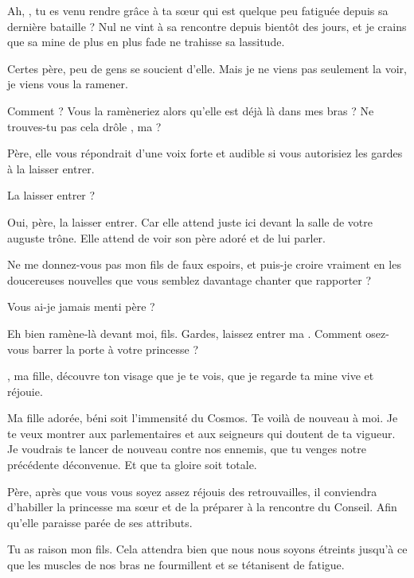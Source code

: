 \begin{drama}

  \roispeaks Ah, \elena, tu es venu rendre grâce à ta sœur qui est quelque peu fatiguée depuis sa dernière bataille ? Nul ne vint à sa rencontre depuis bientôt des jours, et je crains que sa mine de plus en plus fade ne trahisse sa lassitude.

  \elenaspeaks Certes père, peu de gens se soucient d’elle. Mais je ne viens pas seulement la voir, je viens vous la ramener.

  \roispeaks Comment ? Vous la ramèneriez alors qu’elle est déjà là dans mes bras  ?  Ne trouves-tu pas cela drôle \princesse{}, ma \princesse{} ?

  \elenaspeaks Père, elle vous répondrait d’une voix forte et audible si vous autorisiez les gardes à la laisser entrer.

  \elenaspeaks La laisser entrer ?

  \elenaspeaks Oui, père, la laisser entrer. Car elle attend juste ici devant la salle de votre auguste trône. Elle attend de voir son père adoré et de lui parler.


  \roispeaks Ne me donnez-vous pas mon fils de faux espoirs, et puis-je croire vraiment en les doucereuses nouvelles que vous semblez davantage chanter que rapporter ?

  \elenaspeaks Vous ai-je jamais menti père ?

  \roispeaks Eh bien ramène-là devant moi, fils. Gardes, laissez entrer ma \princesse. Comment osez-vous  barrer la porte à votre princesse ?


  \princesse, ma fille, découvre ton visage que je te vois, que je regarde ta mine vive et réjouie.


   Ma fille adorée, béni soit l’immensité du Cosmos. Te voilà de nouveau à moi. Je te veux montrer aux parlementaires et aux seigneurs qui doutent de ta vigueur. Je voudrais te lancer de nouveau contre nos ennemis, que tu venges notre précédente déconvenue. Et que ta gloire soit totale.

  \elenaspeaks Père, après que vous vous soyez assez réjouis des retrouvailles, il conviendra d’habiller la princesse ma sœur et de la préparer à la rencontre du Conseil. Afin qu’elle paraisse parée de ses attributs.

  \roispeaks Tu as raison mon fils. Cela attendra bien que nous nous soyons étreints jusqu’à ce que les muscles de nos bras ne fourmillent et se tétanisent de fatigue.

\end{drama}

